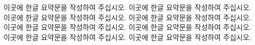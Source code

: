 이곳에 한글 요약문을 작성하여 주십시오. 이곳에 한글 요약문을 작성하여 주십시오.
이곳에 한글 요약문을 작성하여 주십시오. 이곳에 한글 요약문을 작성하여 주십시오.
이곳에 한글 요약문을 작성하여 주십시오. 이곳에 한글 요약문을 작성하여 주십시오.
이곳에 한글 요약문을 작성하여 주십시오. 이곳에 한글 요약문을 작성하여 주십시오.
